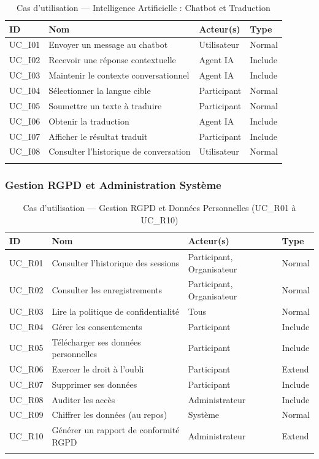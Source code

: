 \begin{longtable}{|m{1.5cm}|m{6cm}|m{3cm}|m{2cm}|}
\hline
\textbf{ID} & \textbf{Nom} & \textbf{Acteur(s)} & \textbf{Type} \\
\hline
\endhead
\endfoot
\endlastfoot
\hline
UC\_I01 & Envoyer un message au chatbot & Utilisateur & Normal \\
\hline
UC\_I02 & Recevoir une réponse contextuelle & Agent IA & Include \\
\hline
UC\_I03 & Maintenir le contexte conversationnel & Agent IA & Include \\
\hline
UC\_I04 & Sélectionner la langue cible & Participant & Normal \\
\hline
UC\_I05 & Soumettre un texte à traduire & Participant & Normal \\
\hline
UC\_I06 & Obtenir la traduction & Agent IA & Include \\
\hline
UC\_I07 & Afficher le résultat traduit & Participant & Include \\
\hline
UC\_I08 & Consulter l'historique de conversation & Utilisateur & Normal \\
\hline
\captionsetup{justification=centering,margin=2cm}
\caption{Cas d'utilisation — Intelligence Artificielle : Chatbot et Traduction}
\label{tab:uc_ia}
\end{longtable}

\subsubsection{Gestion RGPD et Administration Système}

\begin{longtable}{|m{1.5cm}|m{6cm}|m{3.5cm}|m{2cm}|}
\hline
\textbf{ID} & \textbf{Nom} & \textbf{Acteur(s)} & \textbf{Type} \\
\hline
\endhead
\endfoot
\endlastfoot
\hline
UC\_R01 & Consulter l'historique des sessions & Participant, Organisateur & Normal \\
\hline
UC\_R02 & Consulter les enregistrements & Participant, Organisateur & Normal \\
\hline
UC\_R03 & Lire la politique de confidentialité & Tous & Normal \\
\hline
UC\_R04 & Gérer les consentements & Participant & Include \\
\hline
UC\_R05 & Télécharger ses données personnelles & Participant & Include \\
\hline
UC\_R06 & Exercer le droit à l'oubli & Participant & Extend \\
\hline
UC\_R07 & Supprimer ses données & Participant & Include \\
\hline
UC\_R08 & Auditer les accès & Administrateur & Include \\
\hline
UC\_R09 & Chiffrer les données (au repos) & Système & Normal \\
\hline
UC\_R10 & Générer un rapport de conformité RGPD & Administrateur & Extend \\
\hline
\captionsetup{justification=centering,margin=2cm}
\caption{Cas d'utilisation — Gestion RGPD et Données Personnelles (UC\_R01 à UC\_R10)}
\label{tab:uc_rgpd}
\end{longtable}

